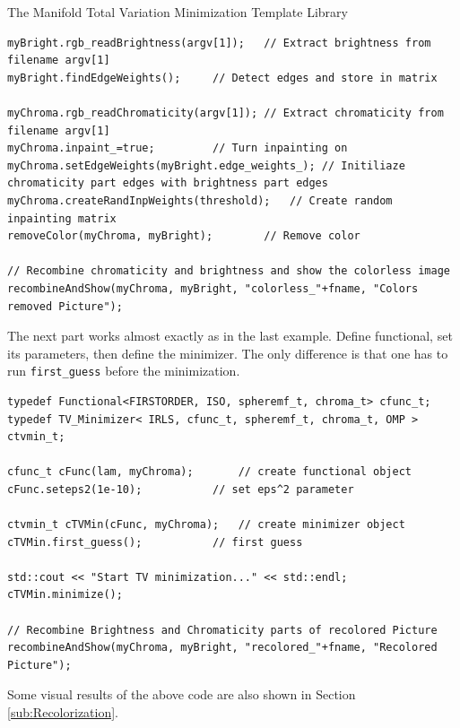 \begin{chapter}{The Manifold Total Variation Minimization Template Library}
\cppinline
\begin{lstlisting}[label=code:tut2_edgeandcolorremoval,caption={Color and brightness input, edge detection and color removal}]
myBright.rgb_readBrightness(argv[1]);	// Extract brightness from filename argv[1]
myBright.findEdgeWeights();		// Detect edges and store in matrix

myChroma.rgb_readChromaticity(argv[1]); // Extract chromaticity from filename argv[1]
myChroma.inpaint_=true;			// Turn inpainting on
myChroma.setEdgeWeights(myBright.edge_weights_); // Initiliaze chromaticity part edges with brightness part edges
myChroma.createRandInpWeights(threshold);   // Create random inpainting matrix
removeColor(myChroma, myBright);	    // Remove color

// Recombine chromaticity and brightness and show the colorless image
recombineAndShow(myChroma, myBright, "colorless_"+fname, "Colors removed Picture");
\end{lstlisting}

The next part works almost exactly as in the last example. Define functional, set its parameters, then define the minimizer. The only difference is that
one has to run \texttt{first\_guess} before the minimization.\\

\cppinline
\begin{lstlisting}[label=code:tut2_functionalmin,caption={Functional and minimizer definition, first guess and minimization}]
typedef Functional<FIRSTORDER, ISO, spheremf_t, chroma_t> cfunc_t;
typedef TV_Minimizer< IRLS, cfunc_t, spheremf_t, chroma_t, OMP > ctvmin_t;

cfunc_t cFunc(lam, myChroma);	    // create functional object
cFunc.seteps2(1e-10);		    // set eps^2 parameter

ctvmin_t cTVMin(cFunc, myChroma);   // create minimizer object
cTVMin.first_guess();		    // first guess

std::cout << "Start TV minimization..." << std::endl;
cTVMin.minimize();		    

// Recombine Brightness and Chromaticity parts of recolored Picture
recombineAndShow(myChroma, myBright, "recolored_"+fname, "Recolored Picture");
\end{lstlisting}

Some visual results of the above code are also shown in Section \ref{sub:Recolorization}.





\end{chapter}
